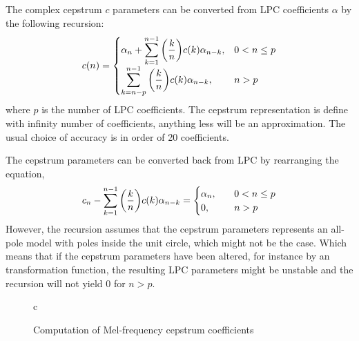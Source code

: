 The complex cepstrum $c$ parameters can be converted from LPC coefficients $\alpha$ by the following recursion:
\begin{equation}
	c(n) = \begin{cases}
		\alpha_n+{\displaystyle\sum_{k=1}^{n-1} \left(\frac{k}{n}\right)} c(k) \alpha_{n-k}, & 0<n\leq p\\
		{\displaystyle\sum_{k=n-p}^{n-1} \left(\frac{k}{n}\right)} c(k) \alpha_{n-k}, & n > p\\
	\end{cases}
\end{equation}
where $p$ is the number of LPC coefficients. The cepstrum representation is define with infinity number of coefficients, anything less will be an approximation. The usual choice of accuracy is in order of 20 coefficients.

The cepstrum parameters can be converted back from LPC by rearranging the equation,
\begin{equation}
	c_n-{\displaystyle\sum_{k=1}^{n-1} \left(\frac{k}{n}\right)} c(k) \alpha_{n-k} = \begin{cases}
		\alpha_n, &\quad 0< n \leq p\\
		0, &\quad n > p
	\end{cases}
\end{equation}
However, the recursion assumes that the cepstrum parameters represents an all-pole model with poles inside the unit circle, which might not be the case. Which means that if the cepstrum parameters have been altered, for instance by an transformation function, the resulting LPC parameters might be unstable and the recursion will not yield 0 for $n>p$.  


% 
% 
\begin{figure}[htbp]
  \centering
  \begin{tabular}[h]{c}
  \end{tabular}
  \caption{Computation of Mel-frequency cepstrum coefficients}
  \label{fig:mfcc}
\end{figure}

